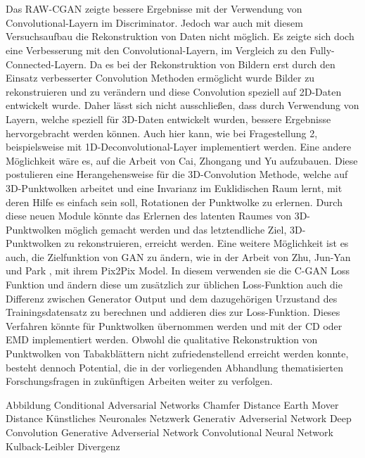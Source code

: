 \documentclass{llncs}
\begin{document}
\\\\
Das RAW-CGAN zeigte bessere Ergebnisse mit der Verwendung von Convolutional-Layern im Discriminator. Jedoch war auch mit diesem Versuchsaufbau die Rekonstruktion von Daten nicht möglich. Es zeigte sich doch eine Verbesserung mit den Convolutional-Layern, im Vergleich zu den Fully-Connected-Layern. Da es bei der Rekonstruktion von Bildern erst durch den Einsatz verbesserter Convolution Methoden ermöglicht wurde Bilder zu rekonstruieren und zu verändern \cite{imagerecon} und diese Convolution speziell auf 2D-Daten entwickelt wurde. Daher lässt sich nicht ausschließen, dass durch Verwendung von Layern, welche speziell für 3D-Daten entwickelt wurden, bessere Ergebnisse hervorgebracht werden können. Auch hier kann, wie bei Fragestellung 2, beispielsweise mit 1D-Deconvolutional-Layer implementiert werden. Eine andere Möglichkeit wäre es, auf die Arbeit von Cai, Zhongang  und Yu \cite{3d-conv} aufzubauen. Diese postulieren eine Herangehensweise für die 3D-Convolution Methode, welche auf 3D-Punktwolken arbeitet und eine Invarianz im Euklidischen Raum lernt, mit deren Hilfe es einfach sein soll, Rotationen der Punktwolke zu erlernen. Durch diese neuen Module könnte das Erlernen des latenten Raumes von 3D-Punktwolken möglich gemacht werden und das letztendliche Ziel, 3D-Punktwolken zu rekonstruieren, erreicht werden.  Eine weitere Möglichkeit ist es auch, die Zielfunktion von GAN zu ändern, wie in der Arbeit von Zhu, Jun-Yan und Park \cite{pix2pix}, mit ihrem Pix2Pix Model. In diesem verwenden sie die C-GAN Loss Funktion und ändern diese um zusätzlich zur üblichen Loss-Funktion auch die Differenz zwischen Generator Output und dem dazugehörigen Urzustand des Trainingsdatensatz zu berechnen und addieren dies zur Loss-Funktion. Dieses Verfahren könnte für Punktwolken übernommen werden und mit der CD oder EMD implementiert werden. Obwohl die qualitative Rekonstruktion von Punktwolken von Tabakblättern nicht zufriedenstellend erreicht werden konnte, besteht dennoch Potential, die in der vorliegenden Abhandlung thematisierten Forschungsfragen in zukünftigen Arbeiten weiter zu verfolgen.
\newpage
\listoffigures
\newpage
\begin{acronym}[Bash]
	 Abbildung
	Conditional Adversarial Networks
	 Chamfer Distance
	 Earth Mover Distance
	 Künstliches Neuronales Netzwerk
	 Generativ Adverserial Network
	Deep Convolution Generative Adverserial Network
	 Convolutional Neural Network
	 Kulback-Leibler Divergenz
\end{acronym}


\end{document}
